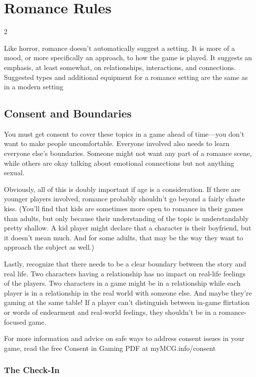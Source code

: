 \part{Romance Rules}

\begin{multicols}{2}

Like horror, romance doesn’t automatically suggest a setting. It is more of a mood, or more specifically an approach, to how the game is played. It suggests an emphasis, at least somewhat, on relationships, interactions, and connections.
Suggested types and additional equipment for a romance setting are the same as in a modern setting

\chapter{Consent and Boundaries}

You must get consent to cover these topics in a game ahead of time—you don’t want to make people uncomfortable. Everyone involved also needs to learn everyone else’s boundaries. Someone might not want any part of a romance scene, while others are okay talking about emotional connections but not anything sexual.

Obviously, all of this is doubly important if age is a consideration. If there are younger players involved, romance probably shouldn’t go beyond a fairly chaste kiss. (You’ll find that kids are sometimes more open to romance in their games than adults, but only because their understanding of the topic is understandably pretty shallow. A kid player might declare that a character is their boyfriend, but it doesn’t mean much. And for some adults, that may be the way they want to approach the subject as well.)

Lastly, recognize that there needs to be a clear boundary between the story and real life. Two characters having a relationship has no impact on real-life feelings of the players. Two characters in a game might be in a relationship while each player is in a relationship in the real world with someone else. And maybe they’re gaming at the same table! If a player can’t distinguish between in-game flirtation or words of endearment and real-world feelings, they shouldn’t be in a romance-focused game.

For more information and advice on safe ways to address consent issues in your game, read the free Consent in Gaming PDF at myMCG.info/consent 

\section{The Check-In}


\end{multicols}
